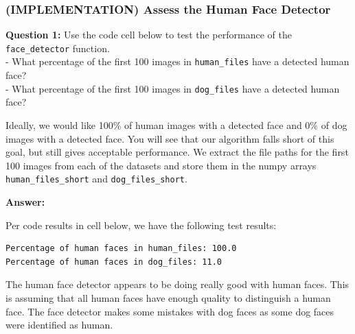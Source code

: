 \documentclass[11pt]{article}
\begin{document}
    \hypertarget{implementation-assess-the-human-face-detector}{%
\subsubsection{(IMPLEMENTATION) Assess the Human Face
Detector}\label{implementation-assess-the-human-face-detector}}

\textbf{Question 1:} Use the code cell below to test the performance of
the \texttt{face\_detector} function.\\
- What percentage of the first 100 images in \texttt{human\_files} have
a detected human face?\\
- What percentage of the first 100 images in \texttt{dog\_files} have a
detected human face?

Ideally, we would like 100\% of human images with a detected face and
0\% of dog images with a detected face. You will see that our algorithm
falls short of this goal, but still gives acceptable performance. We
extract the file paths for the first 100 images from each of the
datasets and store them in the numpy arrays \texttt{human\_files\_short}
and \texttt{dog\_files\_short}.

\textbf{Answer:}

    Per code results in cell below, we have the following test results:

\begin{verbatim}
Percentage of human faces in human_files: 100.0
Percentage of human faces in dog_files: 11.0
\end{verbatim}

The human face detector appears to be doing really good with human
faces. This is assuming that all human faces have enough quality to
distinguish a human face. The face detector makes some mistakes with dog
faces as some dog faces were identified as human.
\end{document}
